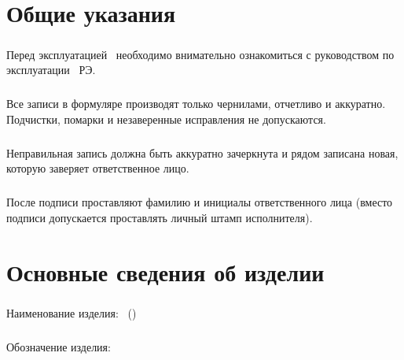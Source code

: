\chapter{Общие указания}

\paragraph{}Перед эксплуатацией \devName\ необходимо внимательно ознакомиться с руководством по эксплуатации \decim\ РЭ.

\paragraph{}Все записи в формуляре производят только чернилами, отчетливо и аккуратно. 
Подчистки, помарки и незаверенные исправления не допускаются.

\paragraph{}Неправильная запись должна быть аккуратно зачеркнута и рядом записана новая, которую заверяет ответственное лицо.

\paragraph{}После подписи проставляют фамилию и инициалы ответственного лица (вместо подписи допускается проставлять личный штамп исполнителя).


\chapter{Основные сведения об изделии}

\paragraph{} Наименование изделия: \devNameFull\ (\devName)
\vspace{5mm}

\paragraph{} Обозначение изделия: \decim
\vspace{5mm}

